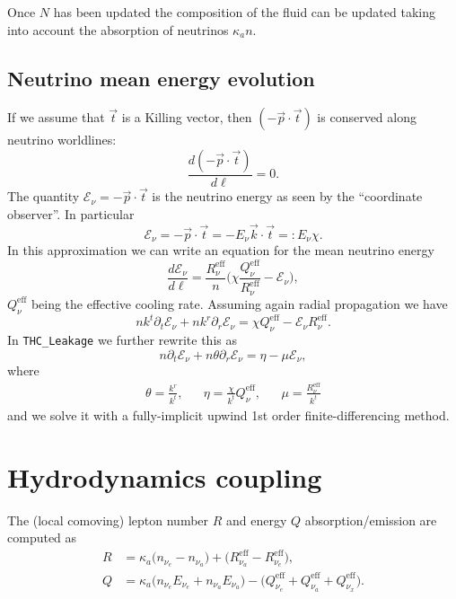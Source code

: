 Once $N$ has been updated the composition of the fluid can be updated taking
into account the absorption of neutrinos $\kappa_a n$.

\subsection{Neutrino mean energy evolution}
If we assume that $\vec{t}$ is a Killing vector, then
$(-\vec{p}\cdot\vec{t})$ is conserved along neutrino worldlines:
\begin{equation}
  \frac{d(-\vec{p}\cdot\vec{t})}{d\ell} = 0.
\end{equation}
The quantity $\mathcal{E}_\nu = - \vec{p}\cdot\vec{t}$ is the neutrino energy as
seen by the ``coordinate observer''. In particular
\begin{equation}
  \mathcal{E}_\nu = - \vec{p}\cdot\vec{t} = - E_\nu \vec{k}\cdot\vec{t} =: E_\nu
  \chi.
\end{equation}
In this approximation we can write an equation for the mean neutrino energy
\begin{equation}
  \frac{d \mathcal{E}_\nu}{d\ell} =
  \frac{R_\nu^{\mathrm{eff}}}{n} \Big( \chi
  \frac{Q_\nu^{\mathrm{eff}}}{R_\nu^{\mathrm{eff}}} - \mathcal{E}_\nu \Big),
\end{equation}
$Q_\nu^{\mathrm{eff}}$ being the effective cooling rate. Assuming again radial
propagation we have
\begin{equation}
  n k^t \partial_t \mathcal{E}_\nu +
  n k^r \partial_r \mathcal{E}_\nu =
 \chi Q_\nu^{\mathrm{eff}} - \mathcal{E}_\nu R_\nu^{\mathrm{eff}}.
\end{equation}
In \texttt{THC\_Leakage} we further rewrite this as
\begin{equation}
  n \partial_t \mathcal{E}_\nu +
    n \theta \partial_r \mathcal{E}_\nu =
      \eta - \mu \mathcal{E}_\nu,
\end{equation}
where
\begin{align}
  \theta = \frac{k^r}{k^t}, &&
  \eta = \frac{\chi}{k^t} Q_\nu^{\mathrm{eff}}, &&
  \mu = \frac{R_\nu^{\mathrm{eff}}}{k^t}
\end{align}
and we solve it with a fully-implicit upwind 1st order finite-differencing
method.

\section{Hydrodynamics coupling}
The (local comoving) lepton number $R$ and energy $Q$ absorption/emission are
computed as
\begin{align}
  R &= \kappa_a \big(n_{\nu_e} - n_{\nu_a}\big) +
    \big(R^{\mathrm{eff}}_{\nu_a} - R^{\mathrm{eff}}_{\nu_e}\big), \\
  Q &= \kappa_a \big(n_{\nu_e} E_{\nu_e} + n_{\nu_a} E_{\nu_a}\big) -
    \big(Q^{\mathrm{eff}}_{\nu_e} + Q^{\mathrm{eff}}_{\nu_a} +
    Q^{\mathrm{eff}}_{\nu_x} \big).
\end{align}

